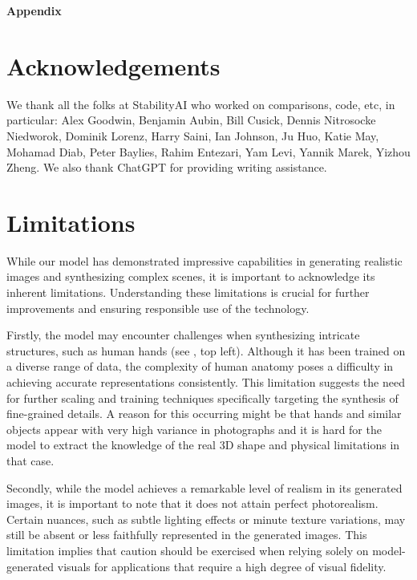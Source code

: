 \documentclass{article}
\begin{document}
\clearpage
\newpage


\appendix
\begin{center}
\Huge\textbf{Appendix}
\end{center}

\section{Acknowledgements}
We thank all the folks at StabilityAI who worked on comparisons, code, etc, in particular: Alex Goodwin, Benjamin Aubin, Bill Cusick, Dennis Nitrosocke Niedworok, Dominik Lorenz, Harry Saini, Ian Johnson, Ju Huo, Katie May, Mohamad Diab, Peter Baylies, Rahim Entezari, Yam Levi, Yannik Marek, Yizhou Zheng. We also thank ChatGPT for providing writing assistance.

\section{Limitations}
\failureplot
While our model has demonstrated impressive capabilities in generating realistic images and synthesizing complex scenes, it is important to acknowledge its inherent limitations. Understanding these limitations is crucial for further improvements and ensuring responsible use of the technology.

Firstly, the model may encounter challenges when synthesizing intricate structures, such as human hands (see , top left). Although it has been trained on a diverse range of data, the complexity of human anatomy poses a difficulty in achieving accurate representations consistently. This limitation suggests the need for further scaling and training techniques specifically targeting the synthesis of fine-grained details. A reason for this occurring might be that hands and similar objects appear with very high variance in photographs and it is hard for the model to extract the knowledge of the real 3D shape and physical limitations in that case.

Secondly, while the model achieves a remarkable level of realism in its generated images, it is important to note that it does not attain perfect photorealism. Certain nuances, such as subtle lighting effects or minute texture variations, may still be absent or less faithfully represented in the generated images. This limitation implies that caution should be exercised when relying solely on model-generated visuals for applications that require a high degree of visual fidelity.
\end{document}
